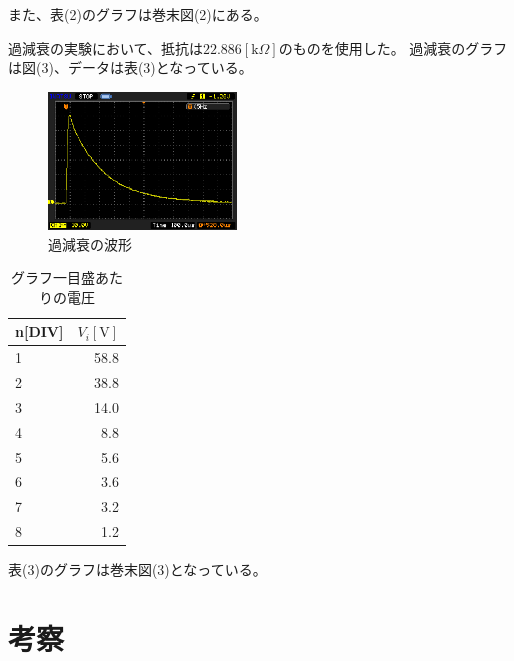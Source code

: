 \documentclass[a4j,10pt]{jarticle}
\begin{document}
また、表(2)のグラフは巻末図(2)にある。

過減衰の実験において、抵抗は$22.886[\mathrm k \Omega]$のものを使用した。
過減衰のグラフは図(3)、データは表(3)となっている。
\begin{figure}[h]
\begin{center}
\includegraphics[width=5cm]{over.eps}
\caption{過減衰の波形}
\end{center}
\end{figure}
\begin{table}[h]
\begin{center}
\caption{グラフ一目盛あたりの電圧}
\begin{tabular}{|l|r|}
\hline
n[DIV]&$V_{i}[\mathrm V]$ \\ \hline \hline
1&58.8 \\ \hline
2&38.8 \\ \hline
3&14.0 \\ \hline
4&8.8  \\ \hline
5&5.6  \\ \hline
6&3.6  \\ \hline
7&3.2  \\ \hline
8&1.2  \\ \hline
\end{tabular}
\end{center}
\end{table}
表(3)のグラフは巻末図(3)となっている。
\section{考察}
\end{document}
